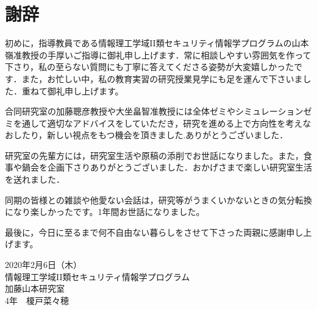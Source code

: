 \chapter*{謝辞}
初めに，指導教員である情報理工学域I\hspace{-1pt}I類セキュリティ情報学プログラムの山本嶺准教授の手厚いご指導に御礼申し上げます．常に相談しやすい雰囲気を作って下さり，私の至らない質問にも丁寧に答えてくださる姿勢が大変嬉しかったです．また，お忙しい中，私の教育実習の研究授業見学にも足を運んで下さいました．重ねて御礼申し上げます。

合同研究室の加藤聰彦教授や大坐畠智准教授には全体ゼミやシミュレーションゼミを通して適切なアドバイスをしていただき，研究を進める上で方向性を考えなおしたり，新しい視点をもつ機会を頂きました.ありがとうございました．

研究室の先輩方には，研究室生活や原稿の添削でお世話になりました。また，食事や鍋会を企画下さりありがとうございました．おかげさまで楽しい研究室生活を送れました． 

同期の皆様との雑談や他愛ない会話は，研究等がうまくいかないときの気分転換になり楽しかったです。1年間お世話になりました。

最後に，今日に至るまで何不自由ない暮らしをさせて下さった両親に感謝申し上げます。

\vspace{65mm}

\begin{flushright}
2020年2月6日（木）\\
情報理工学域I\hspace{-1pt}I類セキュリティ情報学プログラム\\
加藤山本研究室\\
4年　榎戸菜々穂
\end{flushright}